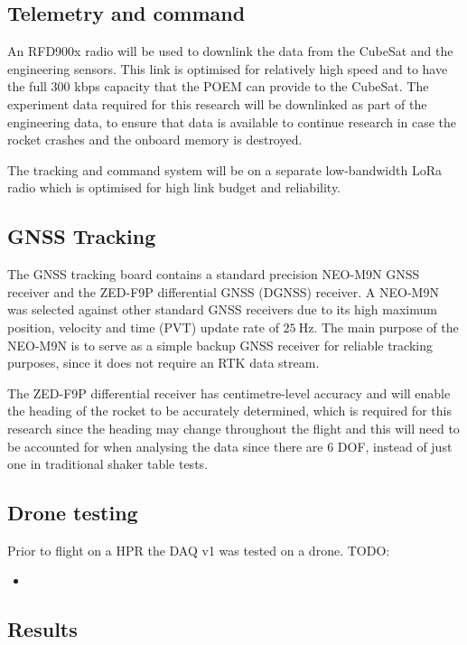 \documentclass[a4paper,11pt]{article}
\begin{document}
\subsection{Telemetry and command}
An RFD900x radio will be used to downlink the data from the CubeSat and the engineering sensors. This link is optimised for relatively high speed and to have the full 300 kbps capacity that the POEM can provide to the CubeSat. The experiment data required for this research will be downlinked as part of the engineering data, to ensure that data is available to continue research in case the rocket crashes and the onboard memory is destroyed.

The tracking and command system will be on a separate low-bandwidth LoRa radio which is optimised for high link budget and reliability.


\subsection{GNSS Tracking}

The GNSS tracking board contains a standard precision NEO-M9N GNSS receiver and the ZED-F9P differential GNSS (DGNSS) receiver. A NEO-M9N was selected against other standard GNSS receivers due to its high maximum position, velocity and time (PVT) update rate of $\SI{25}{\hertz}$. The main purpose of the NEO-M9N is to serve as a simple backup GNSS receiver for reliable tracking purposes, since it does not require an RTK data stream.

The ZED-F9P differential receiver has centimetre-level accuracy and will enable the heading of the rocket to be accurately determined, which is required for this research since the heading may change throughout the flight and this will need to be accounted for when analysing the data since there are 6 DOF, instead of just one in traditional shaker table tests.

\subsection{Drone testing}
Prior to flight on a HPR the DAQ v1 was tested on a drone.
TODO:

\begin{itemize}
  \item
\end{itemize}

\subsection{Results}
\end{document}
